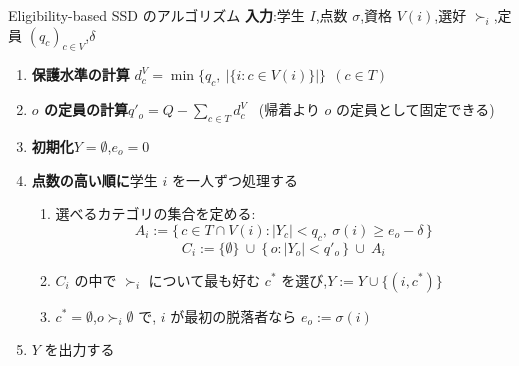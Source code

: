 \documentclass[aspectratio=43,11pt]{beamer}
\newcommand{\dV}[1]{d^{V}_{#1}}
\begin{document}

\begin{frame}{Eligibility-based SSD のアルゴリズム}
\footnotesize
\textbf{入力}:学生 $I$,点数 $\sigma$,資格 $V(i)$,選好 $\succ_i$,定員 $(q_c)_{c \in V}$,$\delta$
\begin{enumerate}
  \item \textbf{保護水準の計算}\quad
        $\dV{c} = \min\{ q_c,\ |\{ i : c \in V(i) \}| \}\ \ (c \in T)$
  \item \textbf{$o$ の定員の計算}\quad $q'_o = Q - \sum_{c \in T} \dV{c}$
        \ (帰着より $o$ の定員として固定できる)
  \item \textbf{初期化}\quad $Y = \emptyset$,$e_o = 0$
  \item \textbf{点数の高い順に}学生 $i$ を一人ずつ処理する
  \begin{enumerate}
    \item 選べるカテゴリの集合を定める:
    \[
      A_i := \{\, c \in T \cap V(i) : |Y_c| < q_c,\ \sigma(i) \geq e_o - \delta \,\}
    \]
    \[
      C_i := \{\emptyset\} \ \cup\ \{\, o : |Y_o| < q'_o \,\} \ \cup\ A_i
    \]
    \item $C_i$ の中で $\succ_i$ について最も好む $c^*$ を選び,$Y := Y \cup \{(i, c^*)\}$
    \item $c^* = \emptyset$,$o \succ_i \emptyset$ で,
          $i$ が最初の脱落者なら $e_o := \sigma(i)$
  \end{enumerate}
  \item $Y$ を出力する
\end{enumerate}
\end{frame}
\end{document}
